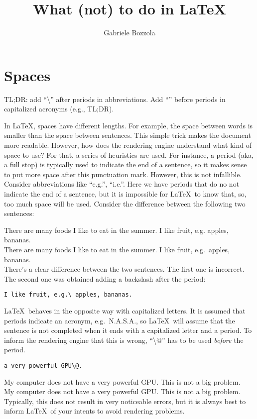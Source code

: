 \documentclass[]{article}
\author{Gabriele Bozzola}
\title{What (not) to do in \LaTeX}
\date{}
\begin{document}
\maketitle
\tableofcontents

\section{Spaces}%
\label{sec:spaces}

TL;DR\@: add ``\textbackslash'' after periods in abbreviations. Add
``\textbackslash@'' before periods in capitalized acronyms (e.g., TL;DR).

In \LaTeX, spaces have different lengths. For example, the space between words
is smaller than the space between sentences. This simple trick makes the
document more readable. However, how does the rendering engine understand what
kind of space to use? For that, a series of heuristics are used. For instance, a
period (aka, a full stop) is typically used to indicate the end of a sentence,
so it makes sense to put more space after this punctuation mark. However, this
is not infallible. Consider abbreviations like ``e.g.'', ``i.e.''. Here we have
periods that do no not indicate the end of a sentence, but it is impossible for
\LaTeX~to know that, so, too much space will be used. Consider the difference
between the following two sentences:

\noindent
There are many foods I like to eat in the summer. I like fruit, e.g. apples, bananas.\\
There are many foods I like to eat in the summer. I like fruit, e.g.\ apples, bananas.\\

There's a clear difference between the two sentences. The first one is incorrect.
The second one was obtained adding a backslash after the period:
\begin{verbatim}
I like fruit, e.g.\ apples, bananas.
\end{verbatim}

\LaTeX~behaves in the opposite way with capitalized letters. It is assumed that
periods indicate an acronym, e.g.~N.A.S.A., so \LaTeX~will assume that the
sentence is not completed when it ends with a capitalized letter and a period.
To inform the rendering engine that this is wrong, ``\textbackslash @'' has to
be used \emph{before} the period.

\begin{verbatim}
a very powerful GPU\@.
\end{verbatim}

\noindent
My computer does not have a very powerful GPU. This is not a big problem.\\
My computer does not have a very powerful GPU\@. This is not a big problem.\\

Typically, this does not result in very noticeable errors, but it is always
best to inform \LaTeX~of your intents to avoid rendering problems.
\end{document}
